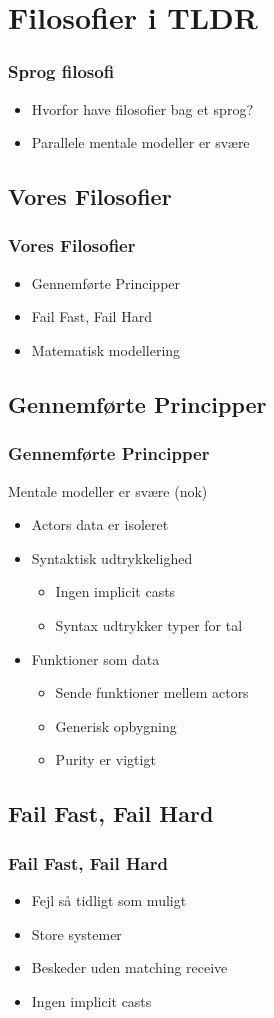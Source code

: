 \section{Filosofier i TLDR}
\begin{frame}
	\frametitle{Sprog filosofi}
	\begin{itemize}
		\item Hvorfor have filosofier bag et sprog?
		\item Parallele mentale modeller er svære
	\end{itemize}
\end{frame}
\subsection{Vores Filosofier}
\begin{frame}
	\frametitle{Vores Filosofier}
	\begin{itemize}
		\item Gennemførte Principper
		\item Fail Fast, Fail Hard
		\item Matematisk modellering
	\end{itemize}
\end{frame}
\subsection{Gennemførte Principper}
\begin{frame}
	\frametitle{Gennemførte Principper}
	Mentale modeller er svære (nok)
	\begin{itemize}
		\item Actors data er isoleret
		\item Syntaktisk udtrykkelighed
		\begin{itemize}
			\item Ingen implicit casts
			\item Syntax udtrykker typer for tal
		\end{itemize}
    		\item Funktioner som data
		\begin{itemize}
			\item Sende funktioner mellem actors
			\item Generisk opbygning
			\item Purity er vigtigt
		\end{itemize}
	\end{itemize}
\end{frame}
\subsection{Fail Fast, Fail Hard}
\begin{frame}
	\frametitle{Fail Fast, Fail Hard}
	\begin{itemize}
		\item Fejl så tidligt som muligt
		\item Store systemer
		\item Beskeder uden matching receive
		\item Ingen implicit casts
	\end{itemize}
\end{frame}
